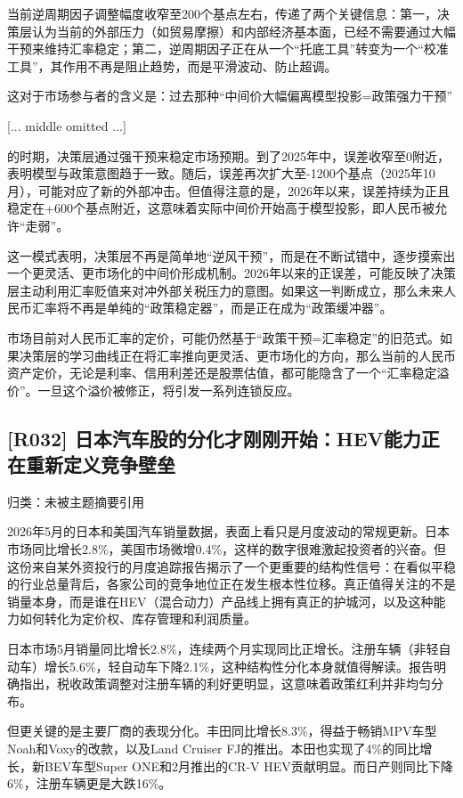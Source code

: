 \documentclass[11pt]{ctexart}
\begin{document}
当前逆周期因子调整幅度收窄至200个基点左右，传递了两个关键信息：第一，决策层认为当前的外部压力（如贸易摩擦）和内部经济基本面，已经不需要通过大幅干预来维持汇率稳定；第二，逆周期因子正在从一个“托底工具”转变为一个“校准工具”，其作用不再是阻止趋势，而是平滑波动、防止超调。

这对于市场参与者的含义是：过去那种“中间价大幅偏离模型投影=政策强力干预”

[... middle omitted ...]

的时期，决策层通过强干预来稳定市场预期。到了2025年中，误差收窄至0附近，表明模型与政策意图趋于一致。随后，误差再次扩大至-1200个基点（2025年10月），可能对应了新的外部冲击。但值得注意的是，2026年以来，误差持续为正且稳定在+600个基点附近，这意味着实际中间价开始高于模型投影，即人民币被允许“走弱”。

这一模式表明，决策层不再是简单地“逆风干预”，而是在不断试错中，逐步摸索出一个更灵活、更市场化的中间价形成机制。2026年以来的正误差，可能反映了决策层主动利用汇率贬值来对冲外部关税压力的意图。如果这一判断成立，那么未来人民币汇率将不再是单纯的“政策稳定器”，而是正在成为“政策缓冲器”。

市场目前对人民币汇率的定价，可能仍然基于“政策干预=汇率稳定”的旧范式。如果决策层的学习曲线正在将汇率推向更灵活、更市场化的方向，那么当前的人民币资产定价，无论是利率、信用利差还是股票估值，都可能隐含了一个“汇率稳定溢价”。一旦这个溢价被修正，将引发一系列连锁反应。

\subsection{[R032] 日本汽车股的分化才刚刚开始：HEV能力正在重新定义竞争壁垒}
{\small\color{refgray}归类：未被主题摘要引用}

2026年5月的日本和美国汽车销量数据，表面上看只是月度波动的常规更新。日本市场同比增长2.8\%，美国市场微增0.4\%，这样的数字很难激起投资者的兴奋。但这份来自某外资投行的月度追踪报告揭示了一个更重要的结构性信号：在看似平稳的行业总量背后，各家公司的竞争地位正在发生根本性位移。真正值得关注的不是销量本身，而是谁在HEV（混合动力）产品线上拥有真正的护城河，以及这种能力如何转化为定价权、库存管理和利润质量。

日本市场5月销量同比增长2.8\%，连续两个月实现同比正增长。注册车辆（非轻自动车）增长5.6\%，轻自动车下降2.1\%，这种结构性分化本身就值得解读。报告明确指出，税收政策调整对注册车辆的利好更明显，这意味着政策红利并非均匀分布。

但更关键的是主要厂商的表现分化。丰田同比增长8.3\%，得益于畅销MPV车型Noah和Voxy的改款，以及Land Cruiser FJ的推出。本田也实现了4\%的同比增长，新BEV车型Super ONE和2月推出的CR-V HEV贡献明显。而日产则同比下降6\%，注册车辆更是大跌16\%。
\end{document}
